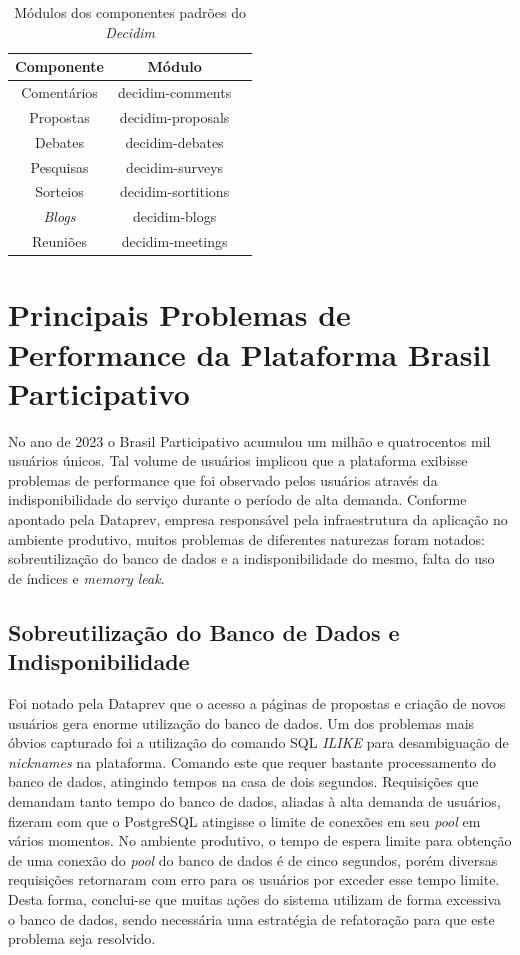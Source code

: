 \begin{table}
  \centering
  \caption{Módulos dos componentes padrões do \textit{Decidim}}
  \label{tab:modulos-components}
  \begin{tabular}{|c|c|c|}
    \hline
    Componente & Módulo \\
    \hline
    Comentários & decidim-comments \\
    Propostas & decidim-proposals \\
    Debates & decidim-debates \\
    Pesquisas & decidim-surveys \\
    Sorteios & decidim-sortitions \\
    \textit{Blogs} & decidim-blogs \\
    Reuniões & decidim-meetings \\
    \hline
  \end{tabular}
\end{table}

\section{Principais Problemas de Performance da Plataforma Brasil Participativo}
\label{sec:principais_problemas_de_performance_da_plataforma_brasil_participativo}

No ano de 2023 o Brasil Participativo acumulou um milhão e quatrocentos mil usuários únicos. Tal volume de usuários implicou que a plataforma exibisse problemas de performance que foi observado pelos usuários através da indisponibilidade do serviço durante o período de alta demanda. Conforme apontado pela Dataprev, empresa responsável pela infraestrutura da aplicação no ambiente produtivo, muitos problemas de diferentes naturezas foram notados: sobreutilização do banco de dados e a indisponibilidade do mesmo, falta do uso de índices e \textit{memory leak}.

\subsection{Sobreutilização do Banco de Dados e Indisponibilidade}

Foi notado pela Dataprev que o acesso a páginas de propostas e criação de novos usuários gera enorme utilização do banco de dados. Um dos problemas mais óbvios capturado foi a utilização do comando SQL \textit{ILIKE} para desambiguação de \textit{nicknames} na plataforma. Comando este que requer bastante processamento do banco de dados, atingindo tempos na casa de dois segundos. Requisições que demandam tanto tempo do banco de dados, aliadas à alta demanda de usuários, fizeram com que o PostgreSQL atingisse o limite de conexões em seu \textit{pool} em vários momentos. No ambiente produtivo, o tempo de espera limite para obtenção de uma conexão do \textit{pool} do banco de dados é de cinco segundos, porém diversas requisições retornaram com erro para os usuários por exceder esse tempo limite. Desta forma, conclui-se que muitas ações do sistema utilizam de forma excessiva o banco de dados, sendo necessária uma estratégia de refatoração para que este problema seja resolvido.

